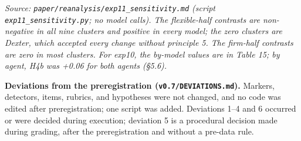 \documentclass[10pt]{article}
\begin{document}
\emph{Source: \texttt{paper/\allowbreak{}reanalysis/\allowbreak{}exp11\_\allowbreak{}sensitivity.\allowbreak{}md} (script \texttt{exp11\_\allowbreak{}sensitivity.\allowbreak{}py}; no model calls). The flexible-half contrasts are non-negative in all nine clusters and positive in every model; the zero clusters are Dexter, which accepted every change without principle 5. The firm-half contrasts are zero in most clusters. For exp10, the by-model values are in Table 15; by agent, H4b was +0.06 for both agents (§5.6).}

\textbf{Deviations from the preregistration (\texttt{v0.\allowbreak{}7/\allowbreak{}DEVIATIONS.\allowbreak{}md}).} Markers, detectors, items, rubrics, and hypotheses were not changed, and no code was edited after preregistration; one script was added. Deviations 1--4 and 6 occurred or were decided during execution; deviation 5 is a procedural decision made during grading, after the preregistration and without a pre-data rule.
\end{document}
